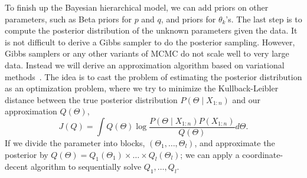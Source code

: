 To finish up the Bayesian hierarchical model, we can add priors on other parameters, such as Beta priors for $p$ and $q$, and priors for $\theta_k$'s. The last step is to compute the posterior distribution of the unknown parameters given the data. It is not difficult to derive a Gibbs sampler to do the posterior sampling. However, Gibbs samplers or any other variants of MCMC do not scale well to very large data. Instead we will derive an approximation algorithm based on variational methods~\citep{bishop06}. The idea is to cast the problem of estimating the posterior distribution as an optimization problem, where we try to minimize the Kullback-Leibler distance between the true posterior distribution $P( \Theta \mid X_{1:n})$ and our approximation $Q(\Theta)$, 
\[ J (Q) = \int Q(\Theta) \log \frac{P(\Theta \mid X_{1:n}) P(X_{1:n})}{Q(\Theta)} d \Theta. \]
If we divide the parameter into blocks, $(\Theta_1, \dots, \Theta_l)$, and approximate the posterior by $ Q(\Theta) = Q_1(\Theta_1) \times  \dots \times Q_l(\Theta_l)$; we can apply a coordinate-decent algorithm to sequentially solve $Q_1, \dots, Q_l$.


